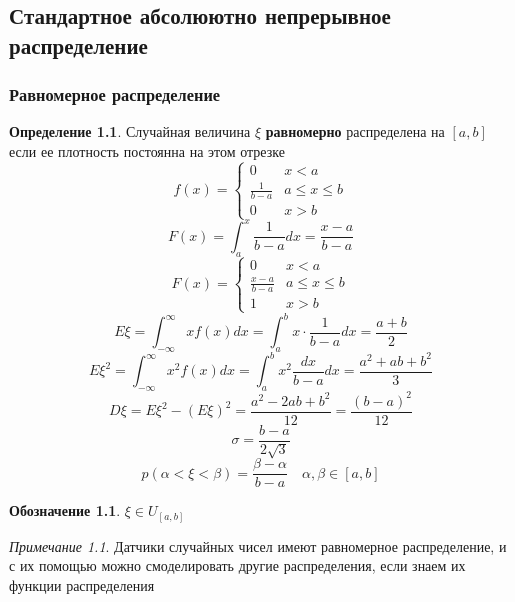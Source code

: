 \documentclass[oneside]{book}
\theoremstyle{plain}
\theoremstyle{remark}
\newtheorem*{remark}{Примечание}
\theoremstyle{definition}
\newtheorem*{definition}{Определение}
\newtheorem*{symb}{Обозначение}
\begin{document}
\chapter{}
\label{sec:orgdb887b9}
\section{Стандартное абсолюютно непрерывное распределение}
\label{sec:org9909f54}
\subsection{Равномерное распределение}
\label{sec:org05a5bb6}
\begin{definition}
Случайная величина \(\xi\) \textbf{равномерно} распределена на \([a, b]\) если ее плотность постоянна на этом отрезке
\[ f(x) = \begin{cases}
0 & x < a \\
\frac{1}{b - a} & a \le x \le b \\
0 & x > b
\end{cases}\]
\[ F(x) = \int_a^x \frac{1}{b - a}dx = \frac{x - a}{b - a} \]
\[ F(x) = \begin{cases}
0 & x < a \\
\frac{x - a}{b - a} & a \le x \le b \\
1 & x > b
\end{cases} \]
\[ E\xi = \int_{-\infty}^\infty x f(x) dx = \int_a^b x \cdot \frac{1}{b - a} dx = \frac{a + b}{2} \]
\[ E\xi^2 = \int_{-\infty}^\infty x^2f(x) dx = \int_a^b x^2 \frac{dx}{b - a}dx = \frac{a^2 + ab + b^2}{3} \]
\[ D\xi = E\xi^2 - (E\xi)^2 = \frac{a^2 - 2ab + b^2}{12} = \frac{(b - a)^2}{12} \]
\[ \sigma = \frac{b - a}{2\sqrt{3}} \]
\[ p(\alpha < \xi < \beta) = \frac{\beta - \alpha}{b - a} \quad \alpha, \beta \in [a, b] \]
\end{definition}
\begin{symb}
\(\xi \in U_{[a, b]}\)
\end{symb}
\begin{remark}
Датчики случайных чисел имеют равномерное распределение, и с их помощью можно смоделировать другие распределения, если знаем их функции распределения
\end{remark}
\end{document}
